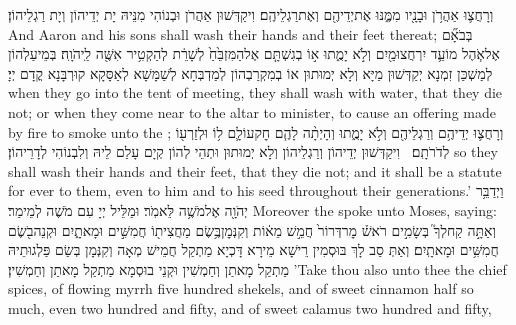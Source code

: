 {וְרָחֲצ֛וּ אַהֲרֹ֥ן וּבָנָ֖יו מִמֶּ֑נּוּ אֶת\maqqaf יְדֵיהֶ֖ם וְאֶת\maqqaf רַגְלֵיהֶֽם׃}
{וִיקַדְּשׁוּן אַהֲרֹן וּבְנוֹהִי מִנֵּיהּ יָת יְדֵיהוֹן וְיָת רַגְלֵיהוֹן׃}
{And Aaron and his sons shall wash their hands and their feet thereat;}{}
{בְּבֹאָ֞ם אֶל\maqqaf אֹ֧הֶל מוֹעֵ֛ד יִרְחֲצוּ\maqqaf מַ֖יִם וְלֹ֣א יָמֻ֑תוּ א֣וֹ בְגִשְׁתָּ֤ם אֶל\maqqaf הַמִּזְבֵּ֙חַ֙ לְשָׁרֵ֔ת לְהַקְטִ֥יר אִשֶּׁ֖ה לַֽיהֹוָֽה׃}
{בְּמֵיעַלְהוֹן לְמַשְׁכַּן זִמְנָא יְקַדְּשׁוּן מַיָּא וְלָא יְמוּתוּן אוֹ בְמִקְרַבְהוֹן לְמַדְבְּחָא לְשַׁמָּשָׁא לְאַסָּקָא קוּרְבָּנָא קֳדָם יְיָ׃}
{when they go into the tent of meeting, they shall wash with water, that they die not; or when they come near to the altar to minister, to cause an offering made by fire to smoke unto the \lord;}{}
{וְרָחֲצ֛וּ יְדֵיהֶ֥ם וְרַגְלֵיהֶ֖ם וְלֹ֣א יָמֻ֑תוּ וְהָיְתָ֨ה לָהֶ֧ם חׇק\maqqaf עוֹלָ֛ם ל֥וֹ וּלְזַרְע֖וֹ לְדֹרֹתָֽם׃ \petucha }
{וִיקַדְּשׁוּן יְדֵיהוֹן וְרַגְלֵיהוֹן וְלָא יְמוּתוּן וּתְהֵי לְהוֹן קְיָם עָלַם לֵיהּ וְלִבְנוֹהִי לְדָרֵיהוֹן׃}
{so they shall wash their hands and their feet, that they die not; and it shall be a statute for ever to them, even to him and to his seed throughout their generations.’}{}
{וַיְדַבֵּ֥ר יְהֹוָ֖ה אֶל\maqqaf מֹשֶׁ֥ה לֵּאמֹֽר׃}
{וּמַלֵּיל יְיָ עִם מֹשֶׁה לְמֵימַר׃}
{Moreover the \lord\space spoke unto Moses, saying:}{}
{וְאַתָּ֣ה קַח\maqqaf לְךָ֮ בְּשָׂמִ֣ים רֹאשׁ֒ מׇר\maqqaf דְּרוֹר֙ חֲמֵ֣שׁ מֵא֔וֹת וְקִנְּמׇן\maqqaf בֶּ֥שֶׂם מַחֲצִית֖וֹ חֲמִשִּׁ֣ים וּמָאתָ֑יִם וּקְנֵה\maqqaf בֹ֖שֶׂם חֲמִשִּׁ֥ים וּמָאתָֽיִם׃}
{וְאַתְּ סַב לָךְ בּוּסְמִין רֵישָׁא מֵירָא דָּכְיָא מַתְקַל חֲמֵישׁ מְאָה וְקִנְּמָן בְּשַׂם פַּלְגוּתֵיהּ מַתְקַל מָאתַן וְחַמְשִׁין וּקְנֵי בוּסְמָא מַתְקַל מָאתַן וְחַמְשִׁין׃}
{’Take thou also unto thee the chief spices, of flowing myrrh five hundred shekels, and of sweet cinnamon half so much, even two hundred and fifty, and of sweet calamus two hundred and fifty,}{}
